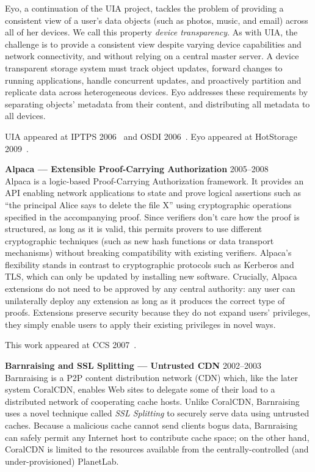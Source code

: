 \documentclass[margin,line,11pt]{resume}
\begin{document}
\begin{resume}
Eyo, a continuation of the UIA project, tackles the problem of
providing a consistent view of a user's data objects (such as photos, music,
and email) across all of her devices.  We call  this property \emph{device
transparency}. As with UIA, the challenge is to provide a consistent view
despite varying device capabilities and network connectivity, and without
relying on a central master server.
A device transparent storage system must track object updates, forward changes
to running applications, handle concurrent updates, and proactively partition
and replicate data across heterogeneous devices.
Eyo addresses these requirements by separating objects' metadata from their
content, and distributing all metadata to all devices.

UIA appeared at IPTPS 2006~\cite{uia:iptps06}
and OSDI 2006~\cite{uia:osdi06}.
Eyo appeared at HotStorage 2009~\cite{eyo:hotstorage09}.


\textbf{Alpaca --- Extensible Proof-Carrying Authorization}
\hfill 2005--2008\\
Alpaca is a logic-based Proof-Carrying Authorization
framework.  It provides an API enabling network applications to state and prove
logical assertions such as ``the principal Alice says to delete the file X''
using cryptographic operations specified in the accompanying proof.  Since
verifiers don't care how the proof is structured, as long as it is valid, this
permits provers to use different cryptographic techniques (such as new hash
functions or data transport mechanisms) without breaking compatibility with
existing verifiers.  Alpaca's flexibility stands in contrast to cryptographic
protocols such as Kerberos and TLS, which can only be updated by installing new
software.  Crucially, Alpaca extensions do not need to be approved by any
central authority: any user can unilaterally deploy any extension as long as it
produces the correct type of proofs.  Extensions preserve security because they
do not expand users' privileges, they simply enable users to apply their
existing privileges in novel ways.

This work appeared at CCS 2007~\cite{alpaca:ccs07}.

\textbf{Barnraising and SSL Splitting --- Untrusted CDN}
\hfill 2002--2003\\
Barnraising is a P2P content distribution network (CDN) which,
like the later system CoralCDN, enables Web sites to delegate
some of their load to a distributed network of cooperating cache hosts.  Unlike
CoralCDN, Barnraising uses a novel technique called \emph{SSL Splitting} to
securely serve data using untrusted caches.  Because a malicious cache cannot
send clients bogus data, Barnraising can safely permit any Internet host to
contribute cache space; on the other hand, CoralCDN is limited to the
resources available from the centrally-controlled (and under-provisioned)
PlanetLab.


\end{resume}
\end{document}
